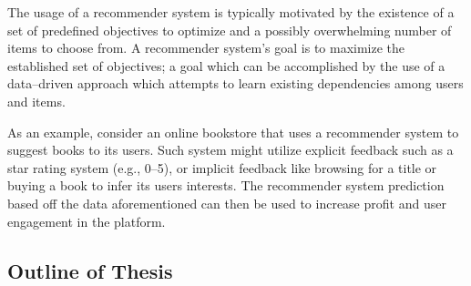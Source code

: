 The usage of a recommender system is typically motivated by the existence of a set of predefined objectives to optimize and a possibly overwhelming number of items to choose from. A recommender system's goal is to maximize the established set of objectives; a goal which can be accomplished by the use of a data--driven approach which attempts to learn existing dependencies among users and items.

As an example, consider an online bookstore that uses a recommender system to suggest books to its users. Such system might utilize explicit feedback such as a star rating system (e.g., 0--5), or implicit feedback like browsing for a title or buying a book to infer its users interests. The recommender system prediction based off the data aforementioned can then be used to increase profit and user engagement in the platform.

\subsection{Outline of Thesis} \label{subsect:intro:outline}
